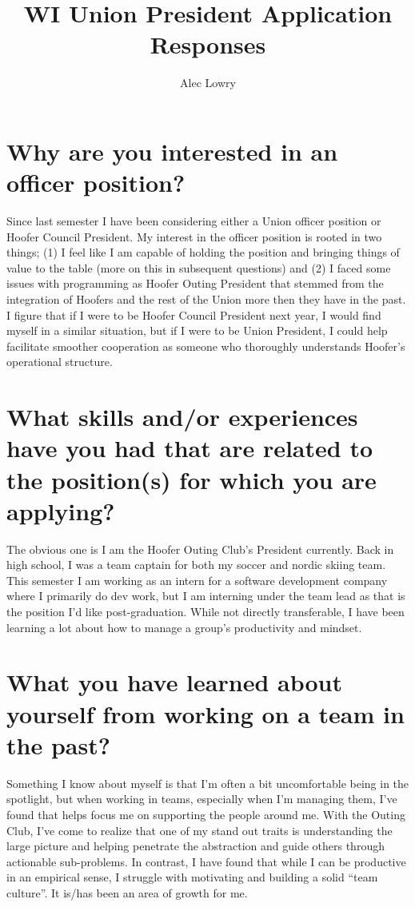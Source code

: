 \documentclass[12pt]{article}
\title{WI Union President Application Responses}
\author{Alec Lowry}
\begin{document}
\maketitle

\section{Why are you interested in an officer position?}

    Since last semester I have been considering either a Union officer position or Hoofer Council President. My interest in the officer position is rooted in two things; (1) I feel like I am capable of holding the position and bringing things of value to the table (more on this in subsequent questions) and (2) I faced some issues with programming as Hoofer Outing President that stemmed from the integration of Hoofers and the rest of the Union more then they have in the past.  I figure that if I were to be Hoofer Council President next year, I would find myself in a similar situation, but if I were to be Union President, I could help facilitate smoother cooperation as someone who thoroughly understands Hoofer's operational structure.

\section{What skills and/or experiences have you had that are related to the position(s) for which you are applying?}

    The obvious one is I am the Hoofer Outing Club's President currently. Back in high school, I was a team captain for both my soccer and nordic skiing team. This semester I am working as an intern for a software development company where I primarily do dev work, but I am interning under the team lead as that is the position I'd like post-graduation.  While not directly transferable, I have been learning a lot about how to manage a group's productivity and mindset.

\section{What you have learned about yourself from working on a team in the past?}

    Something I know about myself is that I'm often a bit uncomfortable being in the spotlight, but when working in teams, especially when I'm managing them, I've found that helps focus me on supporting the people around me. With the Outing Club, I've come to realize that one of my stand out traits is understanding the large picture and helping penetrate the abstraction and guide others through actionable sub-problems. In contrast, I have found that while I can be productive in an empirical sense, I struggle with motivating and building a solid ``team culture''. It is/has been an area of growth for me.
\end{document}
